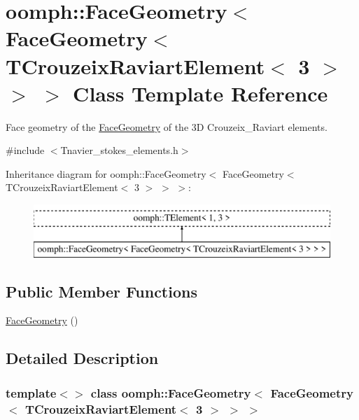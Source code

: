 \hypertarget{classoomph_1_1FaceGeometry_3_01FaceGeometry_3_01TCrouzeixRaviartElement_3_013_01_4_01_4_01_4}{}\section{oomph\+:\+:Face\+Geometry$<$ Face\+Geometry$<$ T\+Crouzeix\+Raviart\+Element$<$ 3 $>$ $>$ $>$ Class Template Reference}
\label{classoomph_1_1FaceGeometry_3_01FaceGeometry_3_01TCrouzeixRaviartElement_3_013_01_4_01_4_01_4}


Face geometry of the \hyperlink{classoomph_1_1FaceGeometry}{Face\+Geometry} of the 3D Crouzeix\+\_\+\+Raviart elements.  




{\ttfamily \#include $<$Tnavier\+\_\+stokes\+\_\+elements.\+h$>$}

Inheritance diagram for oomph\+:\+:Face\+Geometry$<$ Face\+Geometry$<$ T\+Crouzeix\+Raviart\+Element$<$ 3 $>$ $>$ $>$\+:\begin{figure}[H]
\begin{center}
\leavevmode
\includegraphics[height=2.000000cm]{classoomph_1_1FaceGeometry_3_01FaceGeometry_3_01TCrouzeixRaviartElement_3_013_01_4_01_4_01_4}
\end{center}
\end{figure}
\subsection*{Public Member Functions}
\begin{DoxyCompactItemize}
\item 
\hyperlink{classoomph_1_1FaceGeometry_3_01FaceGeometry_3_01TCrouzeixRaviartElement_3_013_01_4_01_4_01_4_ab5ba08f641cf8cd579abc2a533545c19}{Face\+Geometry} ()
\end{DoxyCompactItemize}


\subsection{Detailed Description}
\subsubsection*{template$<$$>$\newline
class oomph\+::\+Face\+Geometry$<$ Face\+Geometry$<$ T\+Crouzeix\+Raviart\+Element$<$ 3 $>$ $>$ $>$}

